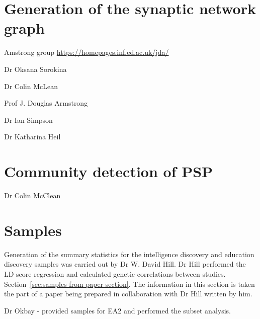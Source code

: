 
\section{Generation of the synaptic network graph}
\label{sec:ack}
Amstrong group \url{https://homepages.inf.ed.ac.uk/jda/}

Dr Oksana Sorokina

Dr Colin McLean

Prof J. Douglas Armstrong


Dr Ian Simpson

Dr Katharina Heil

\section{Community detection of PSP}
Dr Colin McClean


\section{Samples}

Generation of the summary statistics for the intelligence discovery and education discovery samples was carried out by Dr W. David Hill. Dr Hill performed the LD score regression and calculated genetic correlations between studies. Section~\ref{sec:samples from paper section}. The information in this section is taken the part of a paper being prepared in collaboration with Dr Hill written by him. 


Dr Okbay - provided samples for EA2 and performed the subset analysis. 